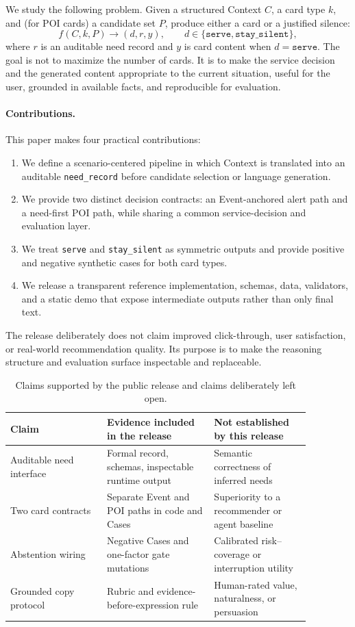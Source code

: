 \documentclass[10pt]{article}
\newcommand{\silent}{\texttt{stay\_silent}}
\newcommand{\serve}{\texttt{serve}}
\newcommand{\needrecord}{\texttt{need\_record}}
\begin{document}
We study the following problem. Given a structured Context $C$, a card type $k$, and (for POI cards) a candidate set $P$, produce either a card or a justified silence:
\begin{equation}
  f(C,k,P) \rightarrow (d, r, y), \qquad d \in \{\serve,\silent\},
\end{equation}
where $r$ is an auditable need record and $y$ is card content when $d=\serve$. The goal is not to maximize the number of cards. It is to make the service decision and the generated content appropriate to the current situation, useful for the user, grounded in available facts, and reproducible for evaluation.

\paragraph{Contributions.}
This paper makes four practical contributions:
\begin{enumerate}
  \item We define a scenario-centered pipeline in which Context is translated into an auditable \needrecord{} before candidate selection or language generation.
  \item We provide two distinct decision contracts: an Event-anchored alert path and a need-first POI path, while sharing a common service-decision and evaluation layer.
  \item We treat \serve{} and \silent{} as symmetric outputs and provide positive and negative synthetic cases for both card types.
  \item We release a transparent reference implementation, schemas, data, validators, and a static demo that expose intermediate outputs rather than only final text.
\end{enumerate}

The release deliberately does not claim improved click-through, user satisfaction, or real-world recommendation quality. Its purpose is to make the reasoning structure and evaluation surface inspectable and replaceable.

\begin{table}[t]
\centering
\small
\caption{Claims supported by the public release and claims deliberately left open.}
\label{tab:claims}
\begin{tabular}{P{0.28\linewidth}P{0.31\linewidth}P{0.28\linewidth}}
\toprule
Claim & Evidence included in the release & Not established by this release \\
\midrule
Auditable need interface & Formal record, schemas, inspectable runtime output & Semantic correctness of inferred needs \\
Two card contracts & Separate Event and POI paths in code and Cases & Superiority to a recommender or agent baseline \\
Abstention wiring & Negative Cases and one-factor gate mutations & Calibrated risk--coverage or interruption utility \\
Grounded copy protocol & Rubric and evidence-before-expression rule & Human-rated value, naturalness, or persuasion \\
\bottomrule
\end{tabular}
\end{table}
\end{document}
